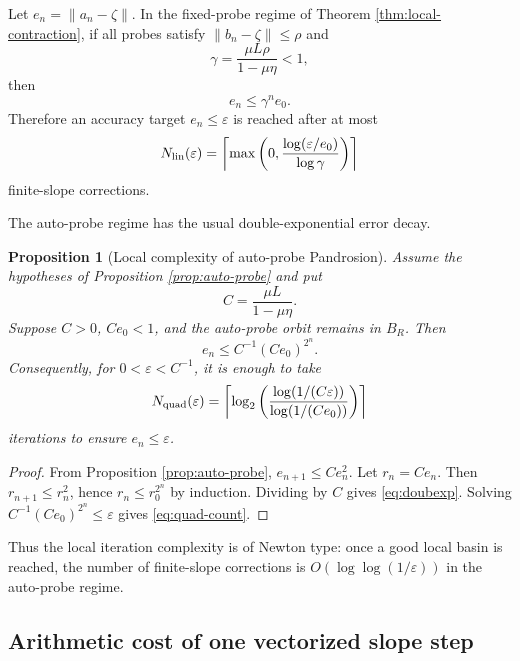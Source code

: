 \documentclass[11pt]{article}
\newtheorem{proposition}[theorem]{Proposition}
\theoremstyle{definition}
\theoremstyle{remark}
\newcommand{\norm}[1]{\left\lVert #1\right\rVert}
\newcommand{\zetaRoot}{\zeta}
\begin{document}
Let $e_n=\norm{a_n-\zetaRoot}$.  In the fixed-probe regime of Theorem \ref{thm:local-contraction}, if all probes satisfy $\norm{b_n-\zetaRoot}\leq \rho$ and
\[
        \gamma=\frac{\mu L\rho}{1-\mu\eta}<1,
\]
then
\[
        e_n\leq \gamma^n e_0.
\]
Therefore an accuracy target $e_n\leq \varepsilon$ is reached after at most
\begin{equation}\label{eq:linear-count}
        N_{\rm lin}(\varepsilon)
        =\left\lceil
        \max\left(0,\frac{\log(\varepsilon/e_0)}{\log \gamma}\right)
        \right\rceil
\end{equation}
finite-slope corrections.

The auto-probe regime has the usual double-exponential error decay.

\begin{proposition}[Local complexity of auto-probe Pandrosion]\label{prop:local-complexity}
Assume the hypotheses of Proposition \ref{prop:auto-probe} and put
\[
        C=\frac{\mu L}{1-\mu\eta}.
\]
Suppose $C>0$, $Ce_0<1$, and the auto-probe orbit remains in $B_R$.  Then
\begin{equation}\label{eq:doubexp}
        e_n\leq C^{-1}(Ce_0)^{2^n}.
\end{equation}
Consequently, for $0<\varepsilon<C^{-1}$, it is enough to take
\begin{equation}\label{eq:quad-count}
        N_{\rm quad}(\varepsilon)
        =\left\lceil
        \log_2\left(
        \frac{\log(1/(C\varepsilon))}{\log(1/(Ce_0))}
        \right)
        \right\rceil
\end{equation}
iterations to ensure $e_n\leq \varepsilon$.
\end{proposition}

\begin{proof}
From Proposition \ref{prop:auto-probe}, $e_{n+1}\leq C e_n^2$.  Let $r_n=Ce_n$.  Then $r_{n+1}\leq r_n^2$, hence $r_n\leq r_0^{2^n}$ by induction.  Dividing by $C$ gives \eqref{eq:doubexp}.  Solving $C^{-1}(Ce_0)^{2^n}\leq \varepsilon$ gives \eqref{eq:quad-count}.
\end{proof}

Thus the local iteration complexity is of Newton type: once a good local basin is reached, the number of finite-slope corrections is $O(\log\log(1/\varepsilon))$ in the auto-probe regime.

\subsection{Arithmetic cost of one vectorized slope step}
\end{document}
